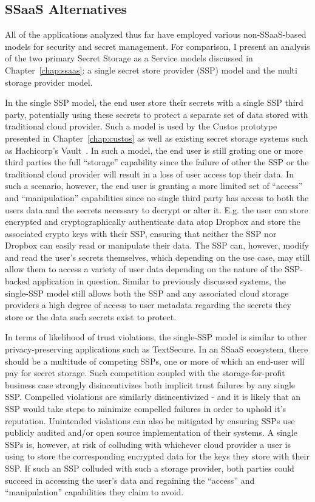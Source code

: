 \subsection{SSaaS Alternatives}

All of the applications analyzed thus far have employed various
non-SSaaS-based models for security and secret management. For
comparison, I present an analysis of the two primary Secret Storage as
a Service models discussed in Chapter~\ref{chap:ssaas}: a single
secret store provider (SSP) model and the multi storage provider
model.

In the single SSP model, the end user store their secrets with a
single SSP third party, potentially using these secrets to protect a
separate set of data stored with traditional cloud provider. Such a
model is used by the Custos prototype presented in
Chapter~\ref{chap:custos} as well as existing secret storage systems
such as Hachicorp's Vault~\cite{vault}. In such a model, the end user
is still grating one or more third parties the full ``storage''
capability since the failure of other the SSP or the traditional cloud
provider will result in a loss of user access top their data. In such
a scenario, however, the end user is granting a more limited set of
``access'' and ``manipulation'' capabilities since no single third
party has access to both the users data and the secrets necessary to
decrypt or alter it. E.g. the user can store encrypted and
cryptographically authenticate data atop Dropbox and store the
associated crypto keys with their SSP, ensuring that neither the SSP
nor Dropbox can easily read or manipulate their data. The SSP can,
however, modify and read the user's secrets themselves, which
depending on the use case, may still allow them to access a variety of
user data depending on the nature of the SSP-backed application in
question. Similar to previously discussed systems, the single-SSP
model still allows both the SSP and any associated cloud storage
providers a high degree of access to user metadata regarding the
secrets they store or the data such secrets exist to protect.

In terms of likelihood of trust violations, the single-SSP model is
similar to other privacy-preserving applications such as
TextSecure. In an SSaaS ecosystem, there should be a multitude of
competing SSPs, one or more of which an end-user will pay for secret
storage. Such competition coupled with the storage-for-profit business
case strongly disincentivizes both implicit trust failures by any
single SSP. Compelled violations are similarly disincentivized - and
it is likely that an SSP would take steps to minimize compelled
failures in order to uphold it's reputation. Unintended violations can
also be mitigated by ensuring SSPs use publicly audited and/or open
source implementation of their systems. A single SSPs is, however, at
risk of colluding with whichever cloud provider a user is using to
store the corresponding encrypted data for the keys they store with
their SSP. If such an SSP colluded with such a storage provider, both
parties could succeed in accessing the user's data and regaining the
``access'' and ``manipulation'' capabilities they claim to avoid.


